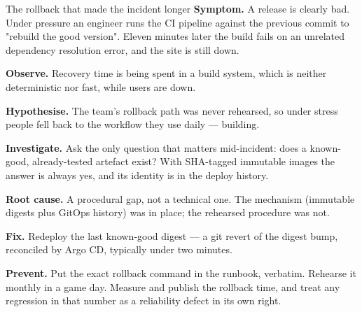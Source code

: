 \begin{debuglab}{The rollback that made the incident longer}
\textbf{Symptom.} A release is clearly bad. Under pressure an engineer runs the CI pipeline against the previous commit to "rebuild the good version". Eleven minutes later the build fails on an unrelated dependency resolution error, and the site is still down.


\begin{tickcheck}
  \item \textbf{Observe.} Recovery time is being spent in a build system, which is neither deterministic nor fast, while users are down.
  \item \textbf{Hypothesise.} The team's rollback path was never rehearsed, so under stress people fell back to the workflow they use daily --- building.
  \item \textbf{Investigate.} Ask the only question that matters mid-incident: does a known-good, already-tested artefact exist? With SHA-tagged immutable images the answer is always yes, and its identity is in the deploy history.
  \item \textbf{Root cause.} A procedural gap, not a technical one. The mechanism (immutable digests plus GitOps history) was in place; the rehearsed procedure was not.
  \item \textbf{Fix.} Redeploy the last known-good digest --- a git revert of the digest bump, reconciled by Argo CD, typically under two minutes.
  \item \textbf{Prevent.} Put the exact rollback command in the runbook, verbatim. Rehearse it monthly in a game day. Measure and publish the rollback time, and treat any regression in that number as a reliability defect in its own right.
\end{tickcheck}
\end{debuglab}

